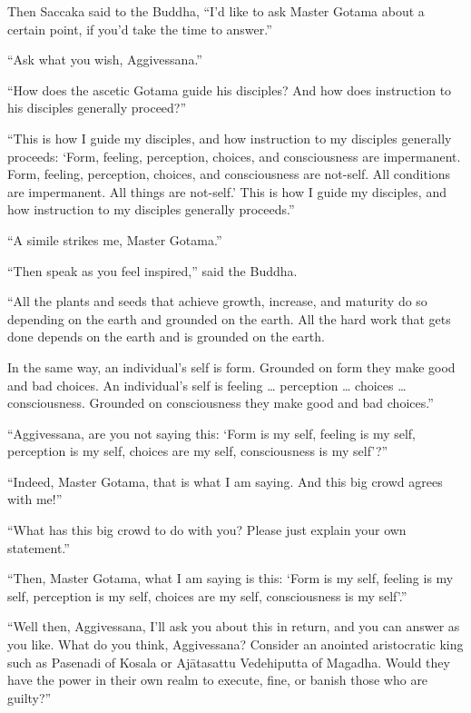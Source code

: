 \documentclass[12pt,openany]{book}%
\begin{document}
Then Saccaka said to the Buddha, “I’d like to ask Master Gotama about a certain point, if you’d take the time to answer.” 

“Ask what you wish, Aggivessana.” 

“How does the ascetic Gotama guide his disciples? And how does instruction to his disciples generally proceed?” 

“This is how I guide my disciples, and how instruction to my disciples generally proceeds: ‘Form, feeling, perception, choices, and consciousness are impermanent. Form, feeling, perception, choices, and consciousness are not-self. All conditions are impermanent. All things are not-self.’ This is how I guide my disciples, and how instruction to my disciples generally proceeds.” 

“A simile strikes me, Master Gotama.” 

“Then speak as you feel inspired,” said the Buddha. 

“All the plants and seeds that achieve growth, increase, and maturity do so depending on the earth and grounded on the earth. All the hard work that gets done depends on the earth and is grounded on the earth. 

In the same way, an individual’s self is form. Grounded on form they make good and bad choices. An individual’s self is feeling … perception … choices … consciousness. Grounded on consciousness they make good and bad choices.” 

“Aggivessana, are you not saying this: ‘Form is my self, feeling is my self, perception is my self, choices are my self, consciousness is my self’?” 

“Indeed, Master Gotama, that is what I am saying. And this big crowd agrees with me!” 

“What has this big crowd to do with you? Please just explain your own statement.” 

“Then, Master Gotama, what I am saying is this: ‘Form is my self, feeling is my self, perception is my self, choices are my self, consciousness is my self’.” 

“Well then, Aggivessana, I’ll ask you about this in return, and you can answer as you like. What do you think, Aggivessana? Consider an anointed aristocratic king such as Pasenadi of Kosala or \textsanskrit{Ajātasattu} Vedehiputta of Magadha. Would they have the power in their own realm to execute, fine, or banish those who are guilty?” 
\end{document}
